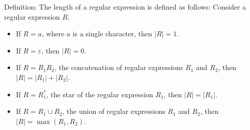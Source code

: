 \documentclass{article}
\begin{document}
Definition: The length of a regular expression is defined as follows: Consider a regular expression $R$.
\begin{itemize}
\item If $R = a$, where $a$ is a single character, then $|R| = 1$.
\item If $R = \varepsilon$, then $|R| = 0$. 
\item If $R = R_1R_2$, the concatenation of regular expressions $R_1$ and $R_2$, then $|R| = |R_1| + |R_2|$.
\item If $R = R_1^*$, the star of the regular expression $R_1$, then $|R| = |R_1|$. 
\item If $R = R_1 \cup R_2$, the union of regular expressions $R_1$ and $R_2$, then $|R| = \max(R_1, R_2)$.
\end{itemize}
\end{document}
